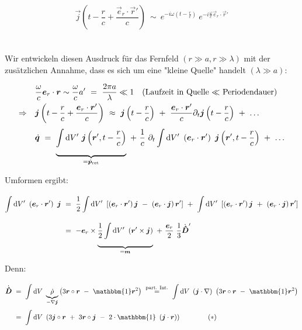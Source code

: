 \begin{equation*}
\vec{j}\left(t-\frac{r}{c} + \frac{\vec{e}_r \cdot\vec{r}'}{c}\right) \ \sim \ e^{-i\omega\left(t-\frac{r}{c}\right)} \ e^{-i\frac{\omega}{c} \vec{e}_r\cdot\vec{r}'}
\end{equation*}\\
\ \\

Wir entwickeln diesen Ausdruck für das Fernfeld $(r\gg a, r \gg \lambda)$ mit der zusätzlichen Annahme, dass es sich um eine "kleine Quelle" handelt $(\lambda\gg a)$:

\begin{align*}
&\frac{\omega}{c} \vec{e}_r \cdot \vec{r} \sim \frac{\omega}{c}a' \ = \  \frac{2\pi a}{\lambda} \ll 1 \quad\text{(Laufzeit in Quelle $\ll$ Periodendauer)}\\
\Rightarrow\quad &\vec{j}\left(t-\frac{r}{c}+\frac{\vec{e}_r\cdot\vec{r}'}{c}\right) \ \approx \ \vec{j}\left(t-\frac{r}{c}\right) \ + \ \frac{\vec{e}_r\cdot\vec{r}'}{c}\partial_t\vec{j}\left(t-\frac{r}{c}\right) \ + \ \ldots\\
&\dot{\vec{q}}  \ = \ \underbrace{\Int{}{}{V'}\vec{j}\left(\vec{r}',t-\frac{r}{c}\right)}_{=\dot{\vec{p}}_{\text{ret}}} \ + \ \frac{1}{c} \ \partial_t \Int{}{}{V'}\left(\vec{e}_r\cdot\vec{r}'\right) \ \vec{j} \left(\vec{r}', t- \frac{r}{c}\right) \ + \ \ldots
\end{align*}

Umformen ergibt:

\begin{align*}
\Int{}{}{V'} \left(\vec{e}_r\cdot\vec{r}'\right) \ \vec{j}  \ &= \ \frac{1}{2}\Int{}{}{V'} \left[\left(\vec{e}_r\cdot\vec{r}'\right)\vec{j} \ - \ \left(\vec{e}_r \cdot \vec{j}\right)\vec{r}'\right] \ + \ \Int{}{}{V'} \left[\left(\vec{e}_r\cdot\vec{r}'\right)\vec{j} \ + \ \left(\vec{e}_r\cdot\vec{j}\right)\vec{r}'\right]\\
&= \ -\vec{e}_r \times\underbrace{\frac{1}{2}\Int{}{}{V'}\left(\vec{r}'\times\vec{j}\right)}_{=\vec{m}} \ + \ \frac{\vec{e}_r}{2} \ \frac{1}{3} \dot{\tens{D}}'
\end{align*}

Denn:

\begin{align*}
\dot{\tens{D}} \ &= \ \Int{}{}{V}\underbrace{\dot{\rho}}_{-\nabla\vec{j}} \left(3\vec{r}\circ\vec{r} \ - \ \mathbbm{1} \vec{r}^2\right)  \ \overset{\text{part. Int.}}{=} \ \Int{}{}{V} \left(\vec{j}\cdot\nabla\right) \ \left(3\vec{r}\circ\vec{r} \ - \ \mathbbm{1}\vec{r}^2\right)\\
&= \ \Int{}{}{V}\left(3\vec{j}\circ\vec{r} \ + \ 3\vec{r}\circ\vec{j} \ - \ 2 \cdot \mathbbm{1} \ \left(\vec{j}\cdot\vec{r}\right)\right) \qquad\qquad(*)
\end{align*}

